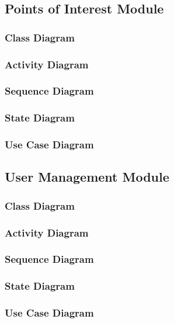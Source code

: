 \documentclass{article}
\begin{document}
		\clearpage

		\subsection{Points of Interest Module}\label{subsec:uml-diagrams-poi}
		

			\subsubsection{Class Diagram}\label{subsec:uml-diagrams-poi-class}
			
			
			\subsubsection{Activity Diagram}\label{subsec:uml-diagrams-poi-act}
			
			
			\subsubsection{Sequence Diagram}\label{subsec:uml-diagrams-poi-seq}
						
			
			\subsubsection{State Diagram}\label{subsec:uml-diagrams-poi-state}
			
			
			\subsubsection{Use Case Diagram}\label{subsec:uml-diagrams-poi-uc}
		
		\clearpage
	
		\subsection{User Management Module}\label{subsec:uml-diagrams-users}
			
		
			\subsubsection{Class Diagram}\label{subsec:uml-diagrams-users-class}
			
			
			\subsubsection{Activity Diagram}\label{subsec:uml-diagrams-users-act}
			
			
			\subsubsection{Sequence Diagram}\label{subsec:uml-diagrams-users-seq}
						
			
			\subsubsection{State Diagram}\label{subsec:uml-diagrams-users-state}
			
			
			\subsubsection{Use Case Diagram}\label{subsec:uml-diagrams-users-uc}
		
\end{document}
